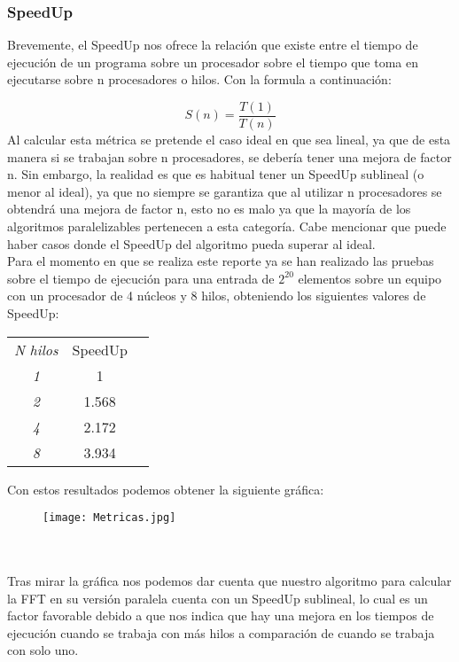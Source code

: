 \documentclass{article}
\begin{document}
\subsubsection{SpeedUp}
Brevemente, el SpeedUp nos ofrece la relación que existe entre el tiempo de ejecución de un programa sobre un procesador sobre el tiempo que toma en ejecutarse sobre n procesadores o hilos. Con la formula a continuación: 

$$
S(n)=\frac{T(1)}{T(n)}
$$
Al calcular esta métrica se pretende el caso ideal en que sea lineal, ya que de esta manera si se trabajan sobre n procesadores, se debería tener una mejora de factor n. Sin embargo, la realidad es que es habitual tener un SpeedUp sublineal (o menor al ideal), ya que no siempre se garantiza que al utilizar n procesadores se obtendrá una mejora de factor n, esto no es malo ya que la mayoría de los algoritmos paralelizables pertenecen a esta categoría. Cabe mencionar que puede haber casos donde el SpeedUp del algoritmo pueda superar al ideal.\\

Para el momento en que se realiza este reporte ya se han realizado las pruebas sobre el tiempo de ejecución para una entrada de $2^{20}$ elementos sobre un equipo con un procesador de 4 núcleos y 8 hilos, obteniendo los siguientes valores de SpeedUp:

\begin{center}
\begin{tabular}{ c c c }
\textit{N hilos} & SpeedUp\\
 \textit{1} & 1\\ 
 \textit{2} & 1.568\\ 
\textit{4} & 2.172\\
\textit{8} & 3.934
\end{tabular}
\end{center}

Con estos resultados podemos obtener la siguiente gráfica:
\begin{figure}[h]
\centering
\texttt{[image: Metricas.jpg]}
\end{figure}
\\ \\
Tras mirar la gráfica nos podemos dar cuenta que nuestro algoritmo para calcular la FFT en su versión paralela cuenta con un SpeedUp sublineal, lo cual es un factor favorable debido a que nos indica que hay una mejora en los tiempos de ejecución cuando se trabaja con más hilos a comparación de cuando se trabaja con solo uno.\\
\end{document}
